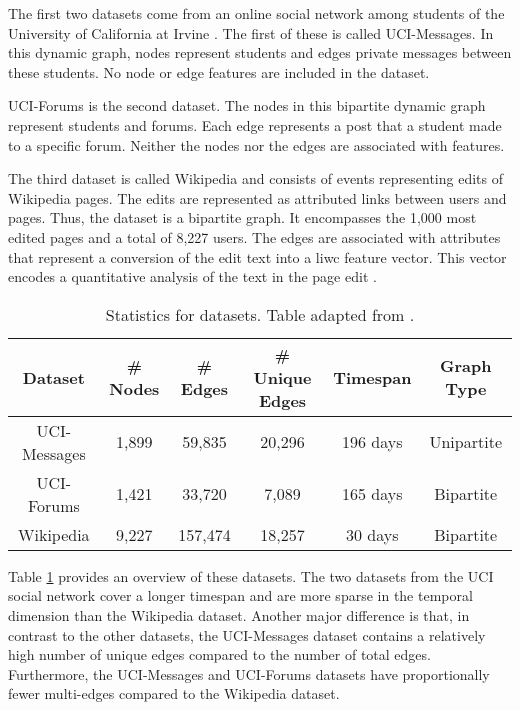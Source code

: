 The first two datasets come from an online social network among students of the University of California at Irvine \cite{kunegis_konect_2013}. The first of these is called UCI-Messages. In this dynamic graph, nodes represent students and edges private messages between these students. No node or edge features are included in the dataset. 

UCI-Forums is the second dataset. The nodes in this bipartite dynamic graph represent students and forums. Each edge represents a post that a student made to a specific forum. Neither the nodes nor the edges are associated with features.

The third dataset is called Wikipedia \cite{kumar_predicting_2019} and consists of events representing edits of Wikipedia pages. The edits are represented as attributed links between users and pages. Thus, the dataset is a bipartite graph. It encompasses the 1,000 most edited pages and a total of 8,227 users. The edges are associated with attributes that represent a conversion of the edit text into a \gls{liwc} \cite{pennebaker_linguistic_2001} feature vector. This vector encodes a quantitative analysis of the text in the page edit \cite{pennebaker_linguistic_2001}.

\begin{table}[ht]
    \centering
    \begin{tabular}{cccccc}
        \hline
         Dataset&  \# Nodes&  \# Edges&  \# Unique Edges& Timespan & Graph Type\\
         \hline
         UCI-Messages \cite{kunegis_konect_2013} & 1,899 & 59,835 & 20,296 &196 days & Unipartite\\
        UCI-Forums \cite{kunegis_konect_2013}& 1,421& 33,720& 7,089&165 days& Bipartite\\
        Wikipedia \cite{kumar_predicting_2019}& 9,227& 157,474& 18,257&30 days& Bipartite\\
        \hline
    \end{tabular}
    \caption{Statistics for datasets. Table adapted from \cite{poursafaei_towards_2022}.}
    \label{t_Datasets}
\end{table}

Table \ref{t_Datasets} provides an overview of these datasets. The two datasets from the UCI social network cover a longer timespan and are more sparse in the temporal dimension than the Wikipedia dataset. Another major difference is that, in contrast to the other datasets, the UCI-Messages dataset contains a relatively high number of unique edges compared to the number of total edges. 
Furthermore, the UCI-Messages and UCI-Forums datasets have proportionally fewer multi-edges compared to the Wikipedia dataset.


